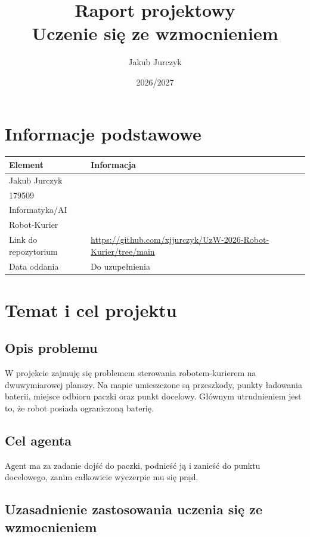 \documentclass[12pt]{article}
\title{Raport projektowy\\Uczenie się ze wzmocnieniem}
\author{Jakub Jurczyk}
\date{2026/2027}
\begin{document}
\maketitle
\tableofcontents
\newpage

\section{Informacje podstawowe}

\begin{center}
\begin{tabular}{p{}p{}}
\toprule
Element & Informacja \\
\midrule
Jakub Jurczyk &  \\
179509 &  \\
Informatyka/AI &  \\
Robot-Kurier &  \\
Link do repozytorium & \url{https://github.com/xjjurczyk/UzW-2026-Robot-Kurier/tree/main} \\
Data oddania & Do uzupełnienia \\
\bottomrule
\end{tabular}
\end{center}

\section{Temat i cel projektu}

\subsection{Opis problemu}

W projekcie zajmuję się problemem sterowania robotem-kurierem na dwuwymiarowej planszy. Na mapie umieszczone są przeszkody, punkty ładowania baterii, miejsce odbioru paczki oraz punkt docelowy. Głównym utrudnieniem jest to, że robot posiada ograniczoną baterię.

\subsection{Cel agenta}

Agent ma za zadanie dojść do paczki, podnieść ją i zanieść do punktu docelowego, zanim całkowicie wyczerpie mu się prąd.

\subsection{Uzasadnienie zastosowania uczenia się ze wzmocnieniem}
\end{document}
